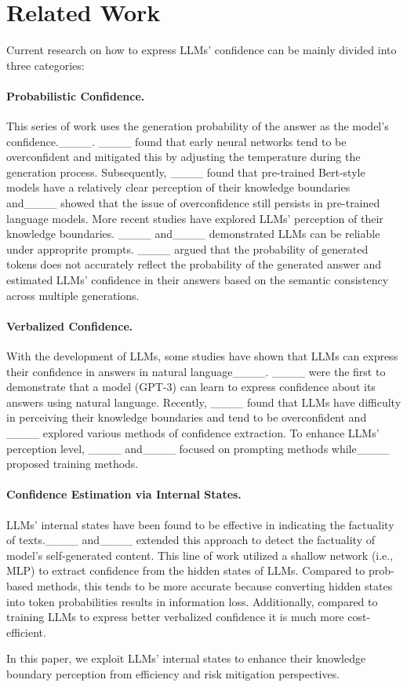 \section{Related Work}
Current research on how to express LLMs' confidence can be mainly divided into three categories:
\paragraph{Probabilistic Confidence.}
This series of work uses the generation probability of the answer as the model's confidence.____. ____ found that early neural networks tend to be overconfident and mitigated this by adjusting the temperature during the generation process. Subsequently, ____ found that pre-trained Bert-style models have a relatively clear perception of their knowledge boundaries and____ showed that the issue of overconfidence still persists in pre-trained language models. More recent studies have explored LLMs’ perception of their knowledge boundaries. ____ and____ demonstrated LLMs can be reliable under approprite prompts. ____ argued that the probability of generated tokens does not accurately reflect the probability of the generated answer and estimated LLMs' confidence in their answers based on the semantic consistency across multiple generations.

\paragraph{Verbalized Confidence.} 
With the development of LLMs, some studies have shown that LLMs can express their confidence in answers in natural language____. ____ were the first to demonstrate that a model (GPT-3) can learn to express confidence about its answers using natural language. Recently, ____ found that LLMs have difficulty in perceiving their knowledge boundaries and tend to be overconfident and ____ explored various methods of confidence extraction. To enhance LLMs' perception level, ____ and____ focused on prompting methods while____ proposed training methods.

\paragraph{Confidence Estimation via Internal States.}
LLMs' internal states have been found to be effective in indicating the factuality of texts.____ and____ extended this approach to detect the factuality of model’s self-generated content. This line of work utilized a shallow network (i.e., MLP) to extract confidence from the hidden states of LLMs. Compared to prob-based methods, this tends to be more accurate because converting hidden states into token probabilities results in information loss. Additionally, compared to training LLMs to express better verbalized confidence it is much more cost-efficient.

 In this paper, we exploit LLMs' internal states to enhance their knowledge boundary perception from efficiency and risk mitigation perspectives.